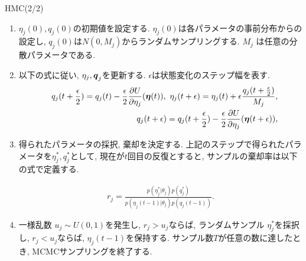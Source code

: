 \documentclass[dvipdfmx]{beamer} %
\newcommand{\bm}[1]{\mbox{\boldmath $#1$}}
\begin{document}
\begin{frame}{HMC(2/2)}

\begin{enumerate}

\item{}
$\eta_j(0), q_j(0)$の初期値を設定する. $\eta_j(0)$は各パラメータの事前分布からの設定し, $q_j(0)$は$N(0,M_j)$からランダムサンプリングする. $M_j$ は任意の分散パラメータである. 
 
\item{}

以下の式に従い, $\eta_j, \bm q_j$を更新する. $\epsilon$は状態変化のステップ幅を表す.
\footnotesize
\begin{eqnarray*}
&&q_j(t+\frac{\epsilon}{2}) = q_j(t) - \frac{\epsilon}{2} \frac{\partial U}{\partial \eta_j} (\bm \eta(t)),\ 
\eta_j(t+\epsilon) = \eta_j(t) + \epsilon \frac{q_j(t + \frac{\epsilon}{2})}{M_j},\\ 
&&q_j(t+\epsilon) = q_j(t+\frac{\epsilon}{2}) - \frac{\epsilon}{2} \frac{\partial U}{\partial \eta_j} (\bm \eta(t + \epsilon)),
\end{eqnarray*}
\normalsize

\item{}
得られたパラメータの採択, 棄却を決定する. 上記のステップで得られたパラメータを$\eta^*_j, q^*_j$として,
現在が$t$回目の反復とすると, サンプルの棄却率は以下の式で定義する.

\vspace{-0.5cm}
\begin{eqnarray*}
r_j = \frac{p(\eta^*_j|\theta_j) p(q^*_j)}{p(\eta_j(t-1)|\theta_j) p(q_j(t-1))}.
\end{eqnarray*}

\item{}
一様乱数 $u_j \sim U(0,1)$を発生し, $r_j > u_j$ならば, ランダムサンプル $\eta^*_j$を採択し, $r_j < u_j$ならば, $\eta_j(t-1)$を保持する. サンプル数$T$が任意の数に達したとき, MCMCサンプリングを終了する. 

\end{enumerate}

\end{frame}
\end{document}
